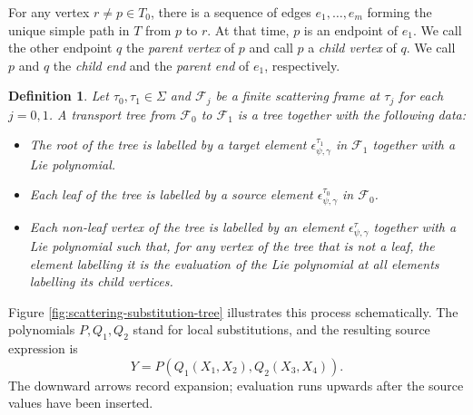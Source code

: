 \documentclass[a4paper,12pt]{amsart}
\numberwithin{equation}{section}
\newtheorem{definition}[theorem]{Definition}
\newcommand{\1}{\mathbf{1}}
\begin{document}
For any vertex $r\neq p\in T_0$, there is a sequence of edges $e_1,\dots,e_m$ forming the unique simple path in $T$ from $p$ to $r$. At that time, $p$ is an endpoint of $e_1$. We call the other endpoint $q$ the \emph{parent vertex} of $p$ and call $p$ a \emph{child vertex} of $q$. We call $p$ and $q$ the \emph{child end} and the \emph{parent end} of $e_1$, respectively.
\begin{definition}
    Let $\tau_0,\tau_1\in\Sigma$ and $\mathscr{F}_j$ be a finite scattering frame at $\tau_j$ for each $j=0,1$. A \emph{transport tree} from $\mathscr{F}_0$ to $\mathscr{F}_1$ is a tree together with the following data:
    \begin{itemize}
        \item The root of the tree is labelled by a target element $\epsilon^{\tau_1}_{\psi,\gamma}$ in $\mathscr{F}_1$ together with a Lie polynomial.
        \item Each leaf of the tree is labelled by a source element $\epsilon^{\tau_0}_{\psi,\gamma}$ in $\mathscr{F}_0$.
        \item Each non-leaf vertex of the tree is labelled by an element $\epsilon^\tau_{\psi,\gamma}$ together with a Lie polynomial such that, for any vertex of the tree that is not a leaf, the element labelling it is the evaluation of the Lie polynomial at all elements labelling its child vertices. 
    \end{itemize}
\end{definition}
Figure \ref{fig:scattering-substitution-tree} illustrates this process schematically. The polynomials $P,Q_1,Q_2$ stand for local substitutions, and the resulting source
expression is
\[Y=P(Q_1(X_1,X_2),Q_2(X_3,X_4)).\]
The downward arrows record expansion; evaluation runs
upwards after the source values have been inserted.
\end{document}
